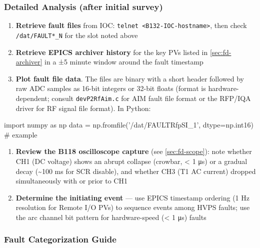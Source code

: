 \subsubsection{Detailed Analysis (after initial survey)}\label{sec:fd-detailed}


\begin{enumerate}
\def\labelenumi{\arabic{enumi}.}
\tightlist
\item
  \textbf{Retrieve fault files} from IOC: \texttt{telnet\ \textless{}B132-\allowbreak{}IOC-\allowbreak{}hostname\textgreater{}}, then check \texttt{/dat/FAULT*\_N} for the slot noted above
\item
  \textbf{Retrieve EPICS archiver history} for the key PVs listed in \cref{sec:fd-archiver} in a ±5 minute window around the fault timestamp
\item
  \textbf{Plot fault file data}. The files are binary with a short header followed by raw ADC samples as 16-bit integers or 32-bit floats (format is hardware-dependent; consult \texttt{devP2RfAim.c} for AIM fault file format or the RFP/IQA driver for RF signal file format). In Python:
\end{enumerate}

\begin{codeblock}
   import numpy as np
   data = np.fromfile('/dat/FAULTRfpSI_1', dtype=np.int16)  # example
\end{codeblock}

\begin{enumerate}
\def\labelenumi{\arabic{enumi}.}
\setcounter{enumi}{3}
\tightlist
\item
  \textbf{Review the B118 oscilloscope capture} (see \cref{sec:fd-scope}): note whether CH1 (DC voltage) shows an abrupt collapse (crowbar, \textless{} 1 μs) or a gradual decay (\textasciitilde100 ms for SCR disable), and whether CH3 (T1 AC current) dropped simultaneously with or prior to CH1
\item
  \textbf{Determine the initiating event} --- use EPICS timestamp ordering (1 Hz resolution for Remote I/O PVs) to sequence events among HVPS faults; use the arc channel bit pattern for hardware-speed (\textless{} 1 μs) faults
\end{enumerate}

\subsubsection{Fault Categorization Guide}\label{sec:fd-categories}


